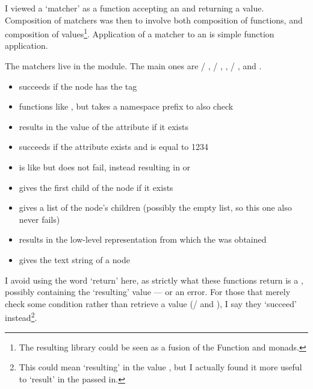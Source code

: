 I viewed a `matcher' as a function accepting an  and returning a  value. Composition of matchers was then to involve both composition of functions, and composition of  values\footnote{The resulting library could be seen as a fusion of the Function and  monads.}. Application of a matcher to an  is simple function application.

The matchers live in the  module. The main ones are  / ,  / , ,  / ,  and .

\begin{itemize}
  \item {} succeeds if the node has the  tag

  \item {} functions like , but takes a namespace prefix to also check

  \item {} results in the value of the  attribute if it exists

  \item {} succeeds if the  attribute exists and is equal to 1234

  \item {} is like  but does not fail, instead resulting in  or 

  \item {} gives the first child of the node if it exists

  \item {} gives a list of the node's children (possibly the empty list, so this one also never fails)

  \item {} results in the low-level  representation from which the  was obtained

  \item {} gives the text string of a  node
\end{itemize}

I avoid using the word `return' here, as strictly what these functions return is a , possibly containing the `resulting' value --- or an error. For those that merely check some condition rather than retrieve a value (/ and ), I say they `succeed' instead\footnote{This could mean `resulting' in the value \code{()}, but I actually found it more useful to `result' in the  passed in.}.

